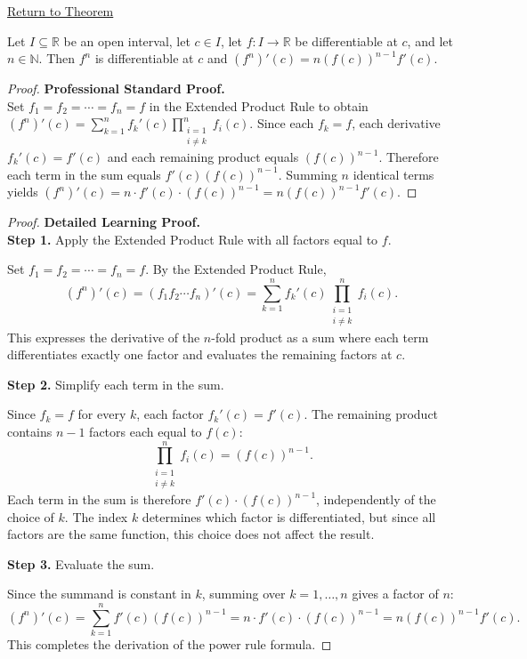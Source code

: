 \newpage
{}
\label{prf:special-case-product-rule}

\begin{remark*}[Return]
\hyperref[cor:power-rule-special-case]{Return to Theorem}
\end{remark*}

\begin{theorem*}
Let $I \subseteq \mathbb{R}$ be an open interval, let $c \in I$, let $f : I \to \mathbb{R}$ be differentiable at $c$, and let $n \in \mathbb{N}$. Then $f^n$ is differentiable at $c$ and $(f^n)'(c) = n(f(c))^{n-1}f'(c)$.
\end{theorem*}

\begin{proof}
\textbf{Professional Standard Proof.}~\\
Set $f_1 = f_2 = \cdots = f_n = f$ in the Extended Product Rule to obtain $(f^n)'(c) = \sum_{k=1}^{n} f_k'(c) \prod_{\substack{i=1\\i\neq k}}^{n} f_i(c)$. Since each $f_k = f$, each derivative $f_k'(c) = f'(c)$ and each remaining product equals $(f(c))^{n-1}$. Therefore each term in the sum equals $f'(c)(f(c))^{n-1}$. Summing $n$ identical terms yields $(f^n)'(c) = n \cdot f'(c) \cdot (f(c))^{n-1} = n(f(c))^{n-1}f'(c)$.
\end{proof}

\begin{proof}
\textbf{Detailed Learning Proof.}~\\

\textbf{Step 1.} Apply the Extended Product Rule with all factors equal to $f$.

Set $f_1 = f_2 = \cdots = f_n = f$. By the Extended Product Rule,
\[
  (f^n)'(c) = (f_1 f_2 \cdots f_n)'(c) = \sum_{k=1}^{n} f_k'(c) \prod_{\substack{i=1\\i\neq k}}^{n} f_i(c).
\]
This expresses the derivative of the $n$-fold product as a sum where each term differentiates exactly one factor and evaluates the remaining factors at $c$.

\textbf{Step 2.} Simplify each term in the sum.

Since $f_k = f$ for every $k$, each factor $f_k'(c) = f'(c)$. The remaining product contains $n-1$ factors each equal to $f(c)$:
\[
  \prod_{\substack{i=1\\i\neq k}}^{n} f_i(c) = (f(c))^{n-1}.
\]
Each term in the sum is therefore $f'(c) \cdot (f(c))^{n-1}$, independently of the choice of $k$. The index $k$ determines which factor is differentiated, but since all factors are the same function, this choice does not affect the result.

\textbf{Step 3.} Evaluate the sum.

Since the summand is constant in $k$, summing over $k = 1, \ldots, n$ gives a factor of $n$:
\[
  (f^n)'(c) = \sum_{k=1}^{n} f'(c)(f(c))^{n-1} = n \cdot f'(c) \cdot (f(c))^{n-1} = n(f(c))^{n-1}f'(c).
\]
This completes the derivation of the power rule formula.
\end{proof}

